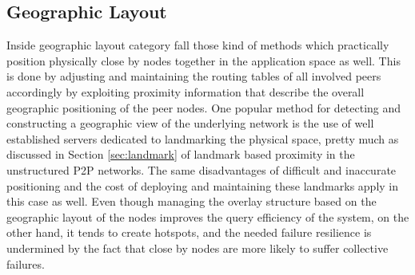 \subsection{Geographic Layout} \label{section:geographic_layout}

Inside geographic layout category fall those kind of methods which practically
position physically close by nodes together in the application space as well.
This is done by adjusting and maintaining the routing tables of all involved
peers accordingly by exploiting proximity information that describe the overall
geographic positioning of the peer nodes. One popular method for detecting and
constructing a geographic view of the underlying network is the use of well
established servers dedicated to landmarking the physical space, pretty much as
discussed in Section \ref{sec:landmark} of landmark based proximity in the
unstructured P2P networks. The same disadvantages of difficult and inaccurate
positioning and the cost of deploying and maintaining these landmarks apply in
this case as well.
Even though managing the overlay structure based on the geographic layout of the
nodes improves the query efficiency of the system, on the other hand, it tends
to create hotspots, and the needed failure resilience is undermined by the fact
that close by nodes are more likely to suffer collective failures.

%
%
%



